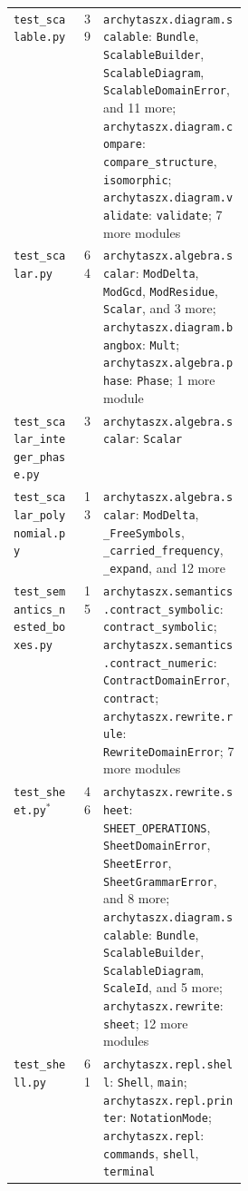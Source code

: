 \begin{xltabular}{\linewidth}{@{}>{\raggedright\arraybackslash}p{0.3\linewidth}r>{\raggedright\arraybackslash}X@{}}
\texttt{test\_\allowbreak{}scalable.py} & 39 & \texttt{archytaszx.\allowbreak{}diagram.\allowbreak{}scalable}: \texttt{Bundle}, \texttt{ScalableBuilder}, \texttt{ScalableDiagram}, \texttt{ScalableDomainError}, and 11 more; \texttt{archytaszx.\allowbreak{}diagram.\allowbreak{}compare}: \texttt{compare\_\allowbreak{}structure}, \texttt{isomorphic}; \texttt{archytaszx.\allowbreak{}diagram.\allowbreak{}validate}: \texttt{validate}; 7 more modules \\
\texttt{test\_\allowbreak{}scalar.py} & 64 & \texttt{archytaszx.\allowbreak{}algebra.\allowbreak{}scalar}: \texttt{ModDelta}, \texttt{ModGcd}, \texttt{ModResidue}, \texttt{Scalar}, and 3 more; \texttt{archytaszx.\allowbreak{}diagram.\allowbreak{}bangbox}: \texttt{Mult}; \texttt{archytaszx.\allowbreak{}algebra.\allowbreak{}phase}: \texttt{Phase}; 1 more module \\
\texttt{test\_\allowbreak{}scalar\_\allowbreak{}integer\_\allowbreak{}phase.py} & 3 & \texttt{archytaszx.\allowbreak{}algebra.\allowbreak{}scalar}: \texttt{Scalar} \\
\texttt{test\_\allowbreak{}scalar\_\allowbreak{}polynomial.py} & 13 & \texttt{archytaszx.\allowbreak{}algebra.\allowbreak{}scalar}: \texttt{ModDelta}, \texttt{\_\allowbreak{}FreeSymbols}, \texttt{\_\allowbreak{}carried\_\allowbreak{}frequency}, \texttt{\_\allowbreak{}expand}, and 12 more \\
\texttt{test\_\allowbreak{}semantics\_\allowbreak{}nested\_\allowbreak{}boxes.py} & 15 & \texttt{archytaszx.\allowbreak{}semantics.\allowbreak{}contract\_\allowbreak{}symbolic}: \texttt{contract\_\allowbreak{}symbolic}; \texttt{archytaszx.\allowbreak{}semantics.\allowbreak{}contract\_\allowbreak{}numeric}: \texttt{ContractDomainError}, \texttt{contract}; \texttt{archytaszx.\allowbreak{}rewrite.\allowbreak{}rule}: \texttt{RewriteDomainError}; 7 more modules \\
\texttt{test\_\allowbreak{}sheet.py}$^{\ast}$ & 46 & \texttt{archytaszx.\allowbreak{}rewrite.\allowbreak{}sheet}: \texttt{SHEET\_\allowbreak{}OPERATIONS}, \texttt{SheetDomainError}, \texttt{SheetError}, \texttt{SheetGrammarError}, and 8 more; \texttt{archytaszx.\allowbreak{}diagram.\allowbreak{}scalable}: \texttt{Bundle}, \texttt{ScalableBuilder}, \texttt{ScalableDiagram}, \texttt{ScaleId}, and 5 more; \texttt{archytaszx.\allowbreak{}rewrite}: \texttt{sheet}; 12 more modules \\
\texttt{test\_\allowbreak{}shell.py} & 61 & \texttt{archytaszx.\allowbreak{}repl.\allowbreak{}shell}: \texttt{Shell}, \texttt{main}; \texttt{archytaszx.\allowbreak{}repl.\allowbreak{}printer}: \texttt{NotationMode}; \texttt{archytaszx.\allowbreak{}repl}: \texttt{commands}, \texttt{shell}, \texttt{terminal} \\

\end{xltabular}
